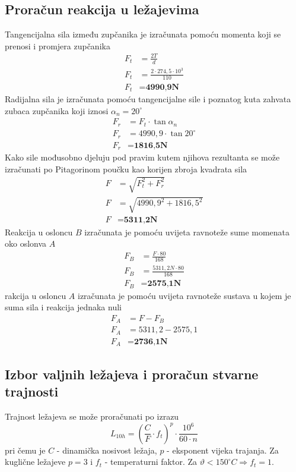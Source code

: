 \documentclass[11pt,a4paper]{article}
\begin{document}
\subsection{Proračun reakcija u ležajevima}
Tangencijalna sila između zupčanika je izračunata pomoću momenta koji se prenosi i promjera zupčanika
\begin{align*}
F_t&=\frac{2T}{d}\\
F_t&=\frac{2 \cdot 274,5 \cdot 10^3}{110}\\
F_t&=\textbf{4990,9N}
\end{align*}
Radijalna sila je izračunata pomoću tangencijalne sile i poznatog kuta zahvata zubaca zupčanika koji iznosi $\alpha_n=20^\circ$
\begin{align*}
F_r&=F_t \cdot \tan \alpha_n\\
F_r&=4990,9 \cdot \tan 20^\circ\\
F_r&=\textbf{1816,5N}
\end{align*}
Kako sile mođusobno djeluju pod pravim kutem njihova rezultanta se može izračunati po Pitagorinom poučku kao korijen zbroja kvadrata sila
\begin{align*}
F&=\sqrt{F_t^2 + F_r^2}\\
F&=\sqrt{4990,9^2 + 1816,5^2}\\
F&=\textbf{5311,2N}
\end{align*}
Reakcija u osloncu $B$ izračunata je pomoću uvijeta ravnoteže sume momenata oko oslonva $A$
\begin{align*}
F_B&=\frac{F \cdot 80}{168}\\
F_B&=\frac{5311,2N \cdot 80}{168}\\
F_B&=\textbf{2575,1N}
\end{align*}
rakcija u osloncu $A$ izračunata je pomoću uvijeta ravnoteže sustava u kojem je suma sila i reakcija jednaka nuli
\begin{align*}
F_A&=F-F_B\\
F_A&=5311,2-2575,1\\
F_A&=\textbf{2736,1N}
\end{align*}

\subsection{Izbor valjnih ležajeva i proračun stvarne trajnosti}
Trajnost ležajeva se može proračunati po izrazu
\begin{equation}
L_{10h}=\left(\frac{C}{F} \cdot f_t \right)^p \cdot \frac{10^6}{60 \cdot n}
\label{equ:trajnostLezaja}
\end{equation}
pri čemu je $C$ - dinamička nosivost ležaja, $p$ - eksponent vijeka trajanja. Za kuglične ležajeve $p=3$ i $f_t$ - temperaturni faktor. Za $\vartheta < 150^\circ C \Rightarrow f_t=1$.
\end{document}
